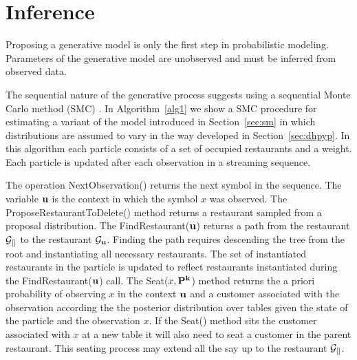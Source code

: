 \section{Inference}
\label{inference}

Proposing a generative model is only the first step in probabilistic modeling. Parameters of the generative model are unobserved and must be inferred from observed data.

The sequential nature of the generative process suggests using a sequential Monte Carlo method (SMC) \cite{Doucet2001}.  In Algorithm~\ref{alg1} we show a SMC procedure for estimating a variant of the model introduced in Section~\ref{sec:sm} in which distributions are assumed to vary in the way developed in Section~\ref{sec:dhpyp}.  In this algorithm each particle consists of a set of occupied restaurants and a weight.  Each particle is updated after each observation in a streaming sequence.

The operation NextObservation() returns the next symbol in the sequence.  The variable $\bf{u}$ is the context in which the symbol $x$ was observed.  The ProposeRestaurantToDelete() method returns a restaurant sampled from a proposal distribution.  The FindRestaurant($\bf{u}$) returns a path from the restaurant $\G_{[]}$ to the restaurant $\G_{\bf{u}}$.  Finding the path requires descending the tree from the root and instantiating all necessary restaurants.  The set of instantiated restaurants in the particle is updated to reflect restaurants instantiated during the FindRestaurant($\bf{u}$) call.  The Seat($x,\bf{P}^k$) method returns the a priori probability of observing $x$ in the context $\bf{u}$ and a customer associated with the observation according the the posterior distribution over tables given the state of the particle and the observation $x$.  If the Seat() method sits the customer associated with $x$ at a new table it will also need to seat a customer in the parent restaurant.  This seating process may extend all the say up to the restaurant $\G_{[]}$.



